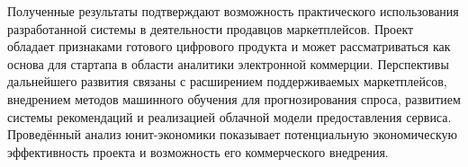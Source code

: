 \documentclass[14pt, oneside]{altsu-bachelor}
\begin{document}
Полученные результаты подтверждают возможность практического использования разработанной системы в деятельности продавцов маркетплейсов. Проект обладает признаками готового цифрового продукта и может рассматриваться как основа для стартапа в области аналитики электронной коммерции. Перспективы дальнейшего развития связаны с расширением поддерживаемых маркетплейсов, внедрением методов машинного обучения для прогнозирования спроса, развитием системы рекомендаций и реализацией облачной модели предоставления сервиса. Проведённый анализ юнит-экономики показывает потенциальную экономическую эффективность проекта и возможность его коммерческого внедрения.

\newpage
{}
\printbibliography[title={СПИСОК ИСПОЛЬЗОВАННОЙ ЛИТЕРАТУРЫ}]



\makelastpage
\end{document}
